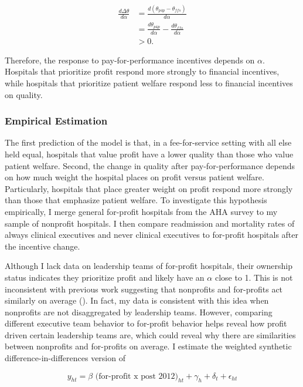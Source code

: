 \documentclass[12pt]{article}
\begin{document}
    \begin{align*}
        \frac{d\Delta\theta}{d\alpha}&=\frac{d(\theta_{p4p}-\theta_{ffs})}{d\alpha}\\
        &=\frac{d\theta_{p4p}}{d\alpha}-\frac{d\theta_{ffs}}{d\alpha}\\
        &> 0.
    \end{align*}

    Therefore, the response to pay-for-performance incentives depends on $\alpha$. Hospitals that prioritize profit respond more strongly to financial incentives, while hospitals that prioritize patient welfare respond less to financial incentives on quality.

    \subsubsection{Empirical Estimation}


    The first prediction of the model is that, in a fee-for-service setting with all else held equal, hospitals that value profit have a lower quality than those who value patient welfare. Second, the change in quality after pay-for-performance depends on how much weight the hospital places on profit versus patient welfare. Particularly, hospitals that place greater weight on profit respond more strongly than those that emphasize patient welfare. To investigate this hypothesis empirically, I merge general for-profit hospitals from the AHA survey to my sample of nonprofit hospitals. I then compare readmission and mortality rates of always clinical executives and never clinical executives to for-profit hospitals after the incentive change. 
    
    Although I lack data on leadership teams of for-profit hospitals, their ownership status indicates they prioritize profit and likely have an $\alpha$ close to 1. This is not inconsistent with previous work suggesting that nonprofits and for-profits act similarly on average (\cite{duggan2002hospital}). In fact, my data is consistent with this idea when nonprofits are not disaggregated by leadership teams. However, comparing different executive team behavior to for-profit behavior helps reveal how profit driven certain leadership teams are, which could reveal why there are similarities between nonprofits and for-profits on average. I estimate the weighted synthetic difference-in-differences version of

    \begin{equation}
    \label{eq:forprofit}
    y_{ht} = \beta \text{ (for-profit x post 2012)}_{ht} + \gamma_{h} + \delta_t + \epsilon_{ht}
    \end{equation}
\end{document}
